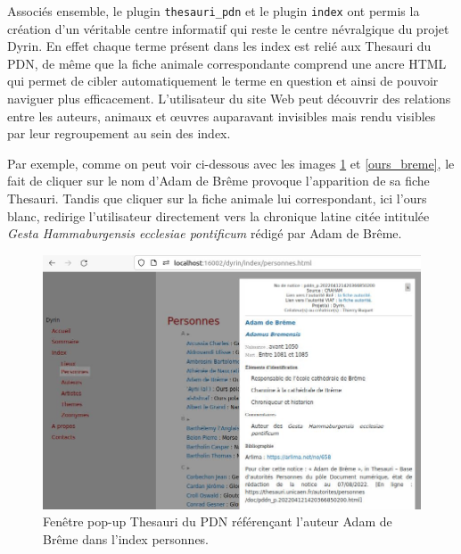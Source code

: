 \documentclass[a4paper,12pt,twoside]{book}
\begin{document}
Associés ensemble, le plugin \texttt{thesauri\_pdn} et le plugin \texttt{index} ont permis la création d'un véritable centre informatif qui reste le centre névralgique du projet Dyrin. En effet chaque terme présent dans les index est relié aux Thesauri du \acrshort{PDN}, de même que la fiche animale correspondante comprend une ancre \acrshort{HTML} qui permet de cibler automatiquement le terme en question et ainsi de pouvoir naviguer plus efficacement. L'utilisateur du site Web peut découvrir des relations entre les auteurs, animaux et \oe{}uvres auparavant invisibles mais rendu visibles par leur regroupement au sein des index.

Par exemple, comme on peut voir ci-dessous avec les images \ref{breme_index} et \ref{ours_breme}, le fait de cliquer sur le nom d'Adam de Brême provoque l'apparition de sa fiche Thesauri. Tandis que cliquer sur la fiche animale lui correspondant, ici l'ours blanc, redirige l'utilisateur directement vers la chronique latine citée intitulée \textit{Gesta Hammaburgensis ecclesiae pontificum} rédigé par Adam de Brême.

\begin{figure}[H]
    \centering
    \includegraphics[width=\linewidth]{img/partie_3/adam_breme.JPG}
    \caption{Fenêtre pop-up Thesauri du \acrshort{PDN} référençant l'auteur Adam de Brême dans l'index personnes.}
    \label{breme_index}
\end{figure}
\end{document}
